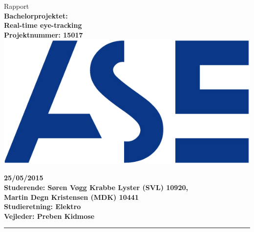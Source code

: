 \documentclass[a4paper,oneside,12pt]{article}
\begin{document}
\begin{titlepage}
\centering
\vfill
{\LARGE Rapport}\\
\vfill
{\bfseries\large
	Bachelorprojektet: \\
	Real-time eye-tracking\\
	Projektnummer: 15017\\
}
\vfill
\includegraphics{ASE_logo.png}
\vfill
{\bfseries\large
	25/05/2015\\
	Studerende: Søren Vøgg Krabbe Lyster (SVL) 10920,\\
	Martin Degn Kristensen (MDK) 10441\\ 
	Studieretning: Elektro \\
	Vejleder: Preben Kidmose \\
	\vfill	
	\rule{6cm}{1pt}
}




\end{titlepage}
\tableofcontents










\printbibliography
\end{document}
